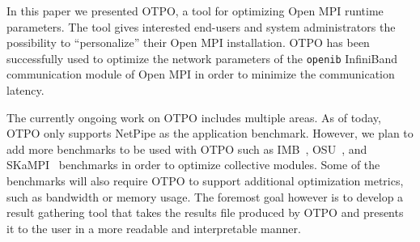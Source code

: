 In this paper we presented OTPO, a tool for optimizing Open MPI
runtime parameters.  The tool gives interested end-users and system
administrators the possibility to ``personalize'' their Open MPI
installation. OTPO has been successfully used to optimize the network
parameters of the {\tt openib} InfiniBand communication module of Open
MPI in order to minimize the communication latency.

The currently ongoing work on OTPO includes multiple areas. As of
today, OTPO only supports NetPipe as the application
benchmark. However, we plan to add more benchmarks to be used with
OTPO such as IMB~\cite{imb}, OSU~\cite{osu}, and SKaMPI~\cite{skampi}
benchmarks in order to optimize collective modules. Some of the
benchmarks will also require OTPO to support additional optimization
metrics, such as bandwidth or memory usage. The foremost goal however
is to develop a result gathering tool that takes the results file
produced by OTPO and presents it to the user in a more readable and
interpretable manner.
